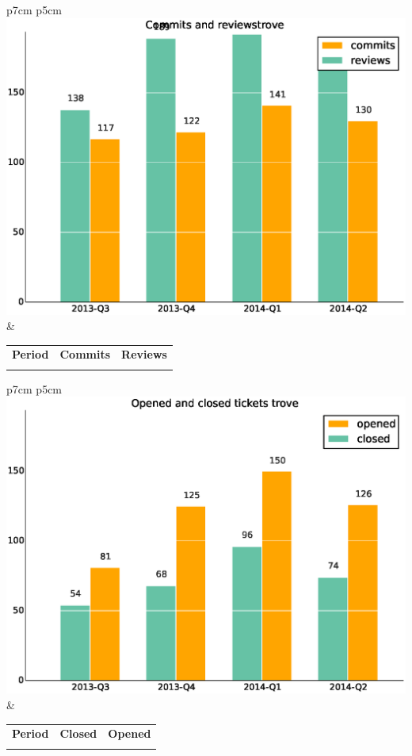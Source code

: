 \documentclass[a4wide,11pt]{report}
\begin{document}
\begin{tabular}{p{7cm} p{5cm}}
    \vspace{0pt} 
    \includegraphics[scale=.35]{figs/commitstrove.eps}
    & 
    \vspace{0pt}
    \begin{tabular}{l|r|r|}%
    \bfseries Period & \bfseries Commits & \bfseries Reviews %
    \csvreader[head to column names]{data/commitstrove.csv}{}%
    {\\ & \commits & \submitted}
    \end{tabular}
\end{tabular}

\begin{tabular}{p{7cm} p{5cm}}
    \vspace{0pt} 
    \includegraphics[scale=.35]{figs/closedtrove.eps}
    & 
    \vspace{0pt}
    \begin{tabular}{l|r|r|}%
\bfseries Period & \bfseries Closed & \bfseries Opened
    \csvreader[head to column names]{data/closedtrove.csv}{}%
    {\\ & \closed & \opened}
    \end{tabular}
\end{tabular}
\end{document}
